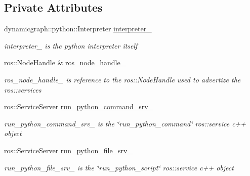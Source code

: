 \subsection*{Private Attributes}
\begin{DoxyCompactItemize}
\item 
\mbox{\label{classdynamic__graph_1_1RosPythonInterpreter_a1e4f91705887914b6e5f649b2fb7fcfa}} 
dynamicgraph\+::python\+::\+Interpreter \hyperlink{classdynamic__graph_1_1RosPythonInterpreter_a1e4f91705887914b6e5f649b2fb7fcfa}{interpreter\+\_\+}
\begin{DoxyCompactList}\small\item\em interpreter\+\_\+ is the python interpreter itself \end{DoxyCompactList}\item 
\mbox{\label{classdynamic__graph_1_1RosPythonInterpreter_ac0ff23f78488bfcbaa6afaae75ec5a8e}} 
ros\+::\+Node\+Handle \& \hyperlink{classdynamic__graph_1_1RosPythonInterpreter_ac0ff23f78488bfcbaa6afaae75ec5a8e}{ros\+\_\+node\+\_\+handle\+\_\+}
\begin{DoxyCompactList}\small\item\em ros\+\_\+node\+\_\+handle\+\_\+ is reference to the ros\+::\+Node\+Handle used to advertize the ros\+::services \end{DoxyCompactList}\item 
ros\+::\+Service\+Server \hyperlink{classdynamic__graph_1_1RosPythonInterpreter_a10b59f74957922f74e84709b2a6920da}{run\+\_\+python\+\_\+command\+\_\+srv\+\_\+}
\begin{DoxyCompactList}\small\item\em run\+\_\+python\+\_\+command\+\_\+srv\+\_\+ is the \char`\"{}run\+\_\+python\+\_\+command\char`\"{} ros\+::service c++ object \end{DoxyCompactList}\item 
ros\+::\+Service\+Server \hyperlink{classdynamic__graph_1_1RosPythonInterpreter_aebb8e4197d11cef0bd49b613b761e081}{run\+\_\+python\+\_\+file\+\_\+srv\+\_\+}
\begin{DoxyCompactList}\small\item\em run\+\_\+python\+\_\+file\+\_\+srv\+\_\+ is the \char`\"{}run\+\_\+python\+\_\+script\char`\"{} ros\+::service c++ object \end{DoxyCompactList}\end{DoxyCompactItemize}



